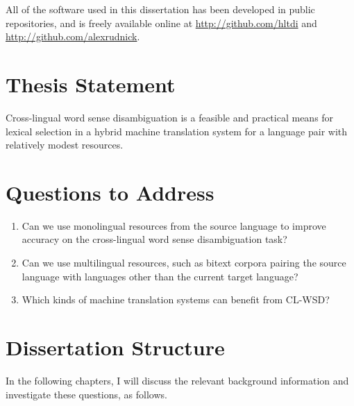 All of the software used in this dissertation has been developed in public
repositories, and is freely available online at
\url{http://github.com/hltdi} and \url{http://github.com/alexrudnick}.

\section{Thesis Statement}
Cross-lingual word sense disambiguation is a feasible and practical
means for lexical selection in a hybrid machine translation system for a
language pair with relatively modest resources.

\section{Questions to Address}
\begin{enumerate}
\item Can we use monolingual resources from the source language to improve
accuracy on the cross-lingual word sense disambiguation task?
\item Can we use multilingual resources, such as bitext corpora pairing the
source language with languages other than the current target language?
\item Which kinds of machine translation systems can benefit from CL-WSD?
\end{enumerate}

\section{Dissertation Structure}
In the following chapters, I will discuss the relevant background information
and investigate these questions, as follows.


